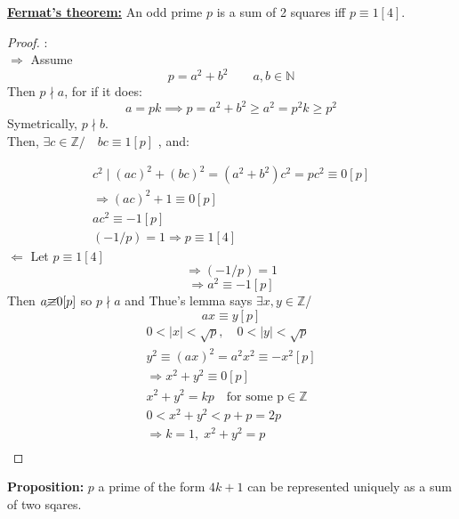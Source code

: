 \documentclass{report}
\newcommand{\nequiv}{\cancel{\equiv}}
\begin{document}
\newpage
\underline{\textbf{Fermat's theorem:}} An odd prime $p$ is a sum of 2 squares iff $p\equiv 1[4]$.
\begin{proof}:\\
								\underline{$\Rightarrow$} Assume \[p=a^2+b^2\qquad a,b \in \mathbb{N}\]
								Then $p\nmid a$, for if it does: \[ a=pk\implies p=a^2+b^2\geq a^2=p^2k \geq p^2\]
								Symetrically, $p\nmid b.$\\
								Then, $\exists c \in \mathbb{Z}/ \quad bc\equiv 1[p]$ ,   and:
								
																										\[\begin{array}{lcl}
																										c^2\mid (ac)^2+(bc)^2=(a^2+b^2)c^2=pc^2\equiv 0[p]\\
																										\Rightarrow (ac)^2+1\equiv 0[p]\\
																										ac^2\equiv -1[p]\\
																										(-1/p)=1 \Rightarrow p\equiv 1[4]
																										\end{array}\]
\underline{$\Leftarrow$} Let $p\equiv 1[4]$ \[\Rightarrow (-1/p)=1\]
																						\[\Rightarrow a^2\equiv -1[p]\]
												Then $a\nequiv 0[p]$ so $p\nmid a$ and Thue's lemma says $\exists x,y \in \mathbb{Z}$/
																								\[ax\equiv y[p]\]
																								\[\begin{array}{ccc}
																								0<|x|<\sqrt{p},\quad 0<|y|<\sqrt{p}\\
																								y^2\equiv (ax)^2=a^2x^2\equiv -x^2[p]\\
																								\Rightarrow x^2+y^2\equiv 0[p]\\
																								x^2+y^2=kp \quad \text{for some p} \in \mathbb{Z}\\
																								0<x^2+y^2<p+p=2p\\
																								\Rightarrow k=1, \;x^2+y^2=p\\
																								\end{array}\]
\end{proof}
\textbf{Proposition:} $p$ a prime of the form $4k+1$ can be represented uniquely as a sum of two sqares.
\end{document}
